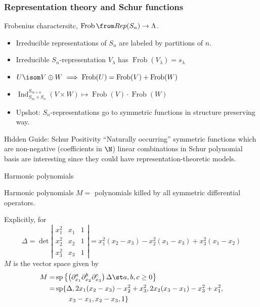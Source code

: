 \documentclass[dvipsnames]{beamer}
\renewcommand{\Span}{\operatorname{sp}}
\DeclareMathOperator{\Ind}{Ind}
\theoremstyle{definition}
\newcounter{c}
\begin{document}
\begin{frame}
  \frametitle{Representation theory and Schur functions}
  Frobenius charactersitc, \(\operatorname{Frob}\from Rep(S_n) \to \Lambda\). \pause
    \begin{itemize}
    \item Irreducible representations of \(S_n\) are labeled by
      partitions of \(n\). \pause
    \item Irreducible \(S_n\)-representation \(V_\lambda\) has 
      \(\operatorname{Frob}(V_\lambda) = s_\lambda\) \pause
    \item \(U \isom V \oplus W \implies \operatorname{Frob}(U) = \operatorname{Frob}(V)+\operatorname{Frob}(W)\)\pause
    \item \(\Ind_{S_m \times S_n}^{S_{m+n}} (V \times W) \mapsto
      \operatorname{Frob}(V) \cdot \operatorname{Frob}(W)\) \pause
    \item Upshot: \(S_n\)-representations go to symmetric functions in
    structure preserving way. \pause
    \end{itemize}
  \begin{block}{Hidden Guide: Schur Positivity}
    ``Naturally occurring'' symmetric functions which are non-negative
    (coefficients in \(\N\))
    linear combinations in Schur polynomial basis
     are interesting since they could have representation-theoretic models.
  \end{block}
\end{frame}
\begin{frame}{Harmonic polynomials}
  \begin{block}{Harmonic polynomials}
   \(M =\) polynomials killed by all symmetric differential
   operators.
  \end{block}\pause
  Explicitly, for
   \[
     \Delta = \det \left|
       \begin{matrix}
         x_1^2 & x_1 & 1\\
         x_2^2 & x_2 & 1\\
         x_3^2 & x_3 & 1
       \end{matrix}
     \right| = x_1^2(x_2-x_3) - x_2^2 (x_1 - x_3) + x_3^2(x_1-x_2)
   \]\pause
   \(M\) is the vector space given by\pause
   \begin{align*}
       M  = & \Span\left\{
\left(           \partial_{x_1}^a
           \partial_{x_2}^b  \partial_{x_3}^c
\right)         \Delta \st a,b,c \geq 0\right\} \\
        = & \Span\{\Delta, 2x_1(x_2-x_3)-x_2^2+x_3^2,
            2x_2(x_3-x_1)-x_3^2+x_1^2, \\
       & \phantom{\Span\{\}}x_3-x_1, x_2-x_3,1\}
   \end{align*}
\end{frame}
\end{document}
